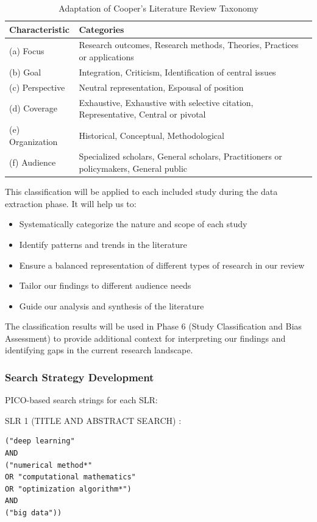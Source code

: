 \documentclass[a4paper,12pt]{article}
\begin{document}
\begin{table}[h]
\caption{Adaptation of Cooper's Literature Review Taxonomy}
\begin{tabularx}{\textwidth}{lX}
\toprule
Characteristic & Categories \\
\midrule
(a) Focus     & Research outcomes, Research methods, Theories, Practices or applications \\
(b) Goal      & Integration, Criticism, Identification of central issues \\
(c) Perspective & Neutral representation, Espousal of position \\
(d) Coverage  & Exhaustive, Exhaustive with selective citation, Representative, Central or pivotal \\
(e) Organization & Historical, Conceptual, Methodological \\
(f) Audience  & Specialized scholars, General scholars, Practitioners or policymakers, General public \\
\bottomrule
\end{tabularx}
\end{table}

This classification will be applied to each included study during the data extraction phase. It will help us to:

\begin{itemize}
    \item Systematically categorize the nature and scope of each study
    \item Identify patterns and trends in the literature
    \item Ensure a balanced representation of different types of research in our review
    \item Tailor our findings to different audience needs
    \item Guide our analysis and synthesis of the literature
\end{itemize}

The classification results will be used in Phase 6 (Study Classification and Bias Assessment) to provide additional context for interpreting our findings and identifying gaps in the current research landscape.

\subsubsection{Search Strategy Development}
PICO-based search strings for each SLR:

SLR 1 (TITLE AND ABSTRACT SEARCH) :
\begin{verbatim}
("deep learning"
AND 
("numerical method*" 
OR "computational mathematics" 
OR "optimization algorithm*")
AND 
("big data"))
\end{verbatim}
\end{document}
